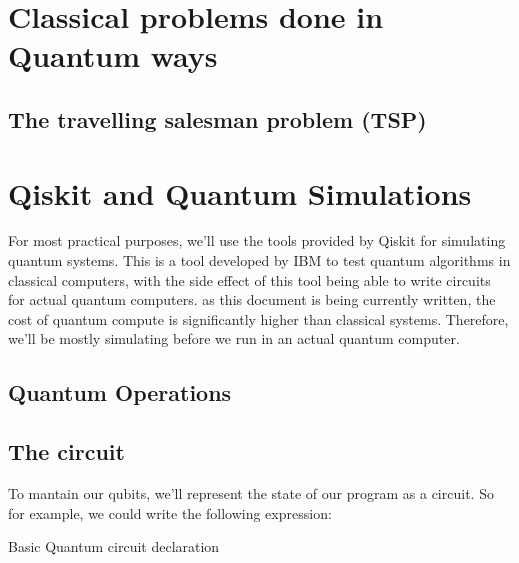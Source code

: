 \documentclass{textbook}
\begin{document}
\chapter{Classical problems done in Quantum ways}

\section{The travelling salesman problem (TSP)}

\chapter{Qiskit and Quantum Simulations}

For most practical purposes, we'll use the tools provided by Qiskit for simulating quantum 
systems. This is a tool developed by IBM to test quantum algorithms in classical computers,
with the side effect of this tool being able to write circuits for actual quantum computers.
as this document is being currently written, the cost of quantum compute is significantly higher
than classical systems. Therefore, we'll be mostly simulating before we run in an actual quantum 
computer.

\section *{Quantum Operations}



\section *{The circuit}

To mantain our qubits, we'll represent the state of our program as a circuit.
So for example, we could write the following expression:


    {Basic Quantum circuit declaration}
\end{document}
